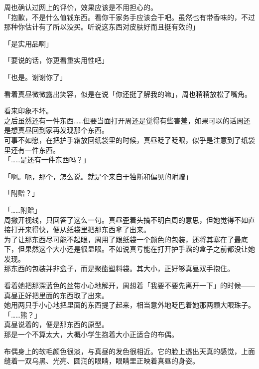 周也确认过网上的评价，效果应该是不用担心的。\\

「抱歉，不是什么值钱东西。看你干家务手应该会干吧。虽然也有带香味的，不过那种你估计有了所以没买。听说这东西对皮肤好而且挺有效的」

「是实用品啊」

「要说的话，你更看重实用性吧」

「也是。谢谢你了」

看着真昼微微露出笑容，似是在说「你还挺了解我的嘛」，周也稍稍放松了嘴角。

看来印象不坏。\\

之后虽然还有一件东西……但要当面打开周还是觉得有些害羞，如果可以的话周还是想真昼回到家再发现那个东西。\\

可事不如愿，在把护手霜放回纸袋里的时候，真昼眨了眨眼，似乎是注意到了纸袋里还有一件东西。\\

「……是还有一件东西吗？」

「啊。呃，那个，怎么说。就是个来自于独断和偏见的附赠」

「附赠？」

「……附赠」\\

周撇开视线，只回答了这么一句。真昼歪着头搞不明白周的意思，但她觉得不如直接打开来得快，便从纸袋里把那东西拿了出来。\\

为了让那东西尽可能不起眼，周用了跟纸袋一个颜色的包装，还将其塞在了最底下，但果然这个大小还是很显眼。不如说真亏能在打开护手霜的盒子之前都没让她发现。\\

那东西的包装并非盒子，而是聚酯塑料袋。其大小，正好够真昼双手抱住。

看着她把那深蓝色的丝带小心地解开，周想着「我要不要先离开一下」的时候——真昼正好把里面的东西取了出来。\\

她用两只手小心地把里面的东西提了起来，相当意外地眨巴着她那两颗大眼珠子。\\

「……熊？」\\

真昼说着的，便是那东西的原型。\\

那是一个不算太大，大概小学生抱着大小正适合的布偶。

布偶身上的软毛颜色很淡，与真昼的发色很相近。它的脸上透出天真的感觉，上面缝着一双乌黑、光亮、圆润的眼睛，眼睛里正映着真昼的身姿。\\


